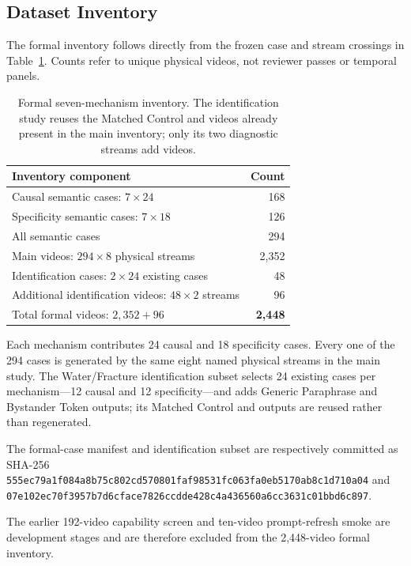 \subsection{Dataset Inventory}
\label{app:dataset-inventory}

The formal inventory follows directly from the frozen case and stream
crossings in Table~\ref{tab:formal-inventory}.  Counts refer to unique physical
videos, not reviewer passes or temporal panels.

\begin{table}[t]
  \centering
  \caption{Formal seven-mechanism inventory.  The identification study reuses
  the Matched Control and \methodshort{} videos already present in the main
  inventory; only its two diagnostic streams add videos.}
  \label{tab:formal-inventory}
  \small
  \begin{tabular}{@{}lr@{}}
    \toprule
    Inventory component & Count \\
    \midrule
    Causal semantic cases: \(7\times24\) & 168 \\
    Specificity semantic cases: \(7\times18\) & 126 \\
    All semantic cases & 294 \\
    Main videos: \(294\times8\) physical streams & 2,352 \\
    Identification cases: \(2\times24\) existing cases & 48 \\
    Additional identification videos: \(48\times2\) streams & 96 \\
    \midrule
    Total formal videos: \(2{,}352+96\) & \textbf{2,448} \\
    \bottomrule
  \end{tabular}
\end{table}

Each mechanism contributes 24 causal and 18 specificity cases.  Every one of
the 294 cases is generated by the same eight named physical streams in the
main study.  The Water/Fracture identification subset selects 24 existing
cases per mechanism---12 causal and 12 specificity---and adds Generic
Paraphrase and Bystander Token outputs; its Matched Control and \methodshort{}
outputs are reused rather than regenerated.  {\footnotesize The formal-case manifest and
identification subset are respectively committed as SHA-256
\texttt{555ec79a\allowbreak{}1f084a8b\allowbreak{}75c802cd\allowbreak{}570801fa\allowbreak{}f98531fc\allowbreak{}063fa0eb\allowbreak{}5170ab8c\allowbreak{}1d710a04}
and
\texttt{07e102ec\allowbreak{}70f3957b\allowbreak{}7d6cface\allowbreak{}7826ccdd\allowbreak{}e428c4a4\allowbreak{}36560a6c\allowbreak{}c3631c01\allowbreak{}bbd6c897}.\par}
The earlier 192-video capability screen and ten-video prompt-refresh smoke are
development stages and are therefore excluded from the 2,448-video formal
inventory.
